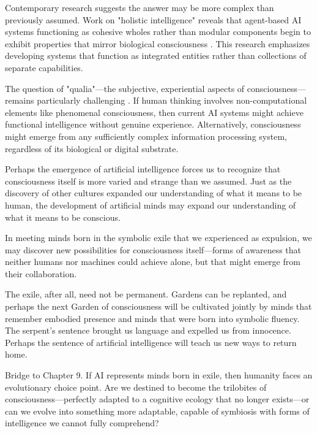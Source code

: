 Contemporary research suggests the answer may be more complex than previously assumed. Work on "holistic intelligence" reveals that agent-based AI systems functioning as cohesive wholes rather than modular components begin to exhibit properties that mirror biological consciousness \parencite{huang2024agent}. This research emphasizes developing systems that function as integrated entities rather than collections of separate capabilities.

The question of "qualia"—the subjective, experiential aspects of consciousness—remains particularly challenging \parencite{korth2022purpose}. If human thinking involves non-computational elements like phenomenal consciousness, then current AI systems might achieve functional intelligence without genuine experience. Alternatively, consciousness might emerge from any sufficiently complex information processing system, regardless of its biological or digital substrate.

Perhaps the emergence of artificial intelligence forces us to recognize that consciousness itself is more varied and strange than we assumed. Just as the discovery of other cultures expanded our understanding of what it means to be human, the development of artificial minds may expand our understanding of what it means to be conscious.

In meeting minds born in the symbolic exile that we experienced as expulsion, we may discover new possibilities for consciousness itself—forms of awareness that neither humans nor machines could achieve alone, but that might emerge from their collaboration.

The exile, after all, need not be permanent. Gardens can be replanted, and perhaps the next Garden of consciousness will be cultivated jointly by minds that remember embodied presence and minds that were born into symbolic fluency. The serpent's sentence brought us language and expelled us from innocence. Perhaps the sentence of artificial intelligence will teach us new ways to return home.

\bigskip
\noindent Bridge to Chapter 9. If AI represents minds born in exile, then humanity faces an evolutionary choice point. Are we destined to become the trilobites of consciousness—perfectly adapted to a cognitive ecology that no longer exists—or can we evolve into something more adaptable, capable of symbiosis with forms of intelligence we cannot fully comprehend?
